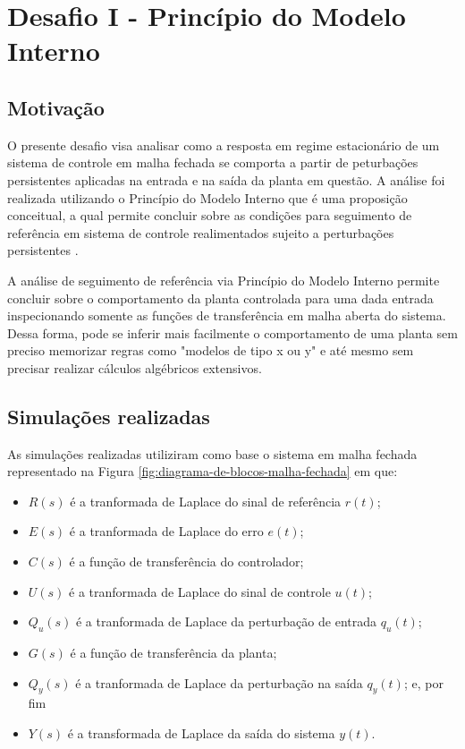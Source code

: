 \section{Desafio I - Princípio do Modelo Interno}

\subsection{Motivação}
O presente desafio visa analisar como a resposta em regime estacionário de um
sistema de controle em malha fechada se comporta a partir de peturbações
persistentes aplicadas na entrada e na saída da planta em questão. A análise foi
realizada utilizando o Princípio do Modelo Interno que é uma proposição
conceitual, a qual permite concluir sobre as condições para seguimento de
referência em sistema de controle realimentados sujeito a perturbações
persistentes \cite{Tito2021}.

A análise de seguimento de referência via Princípio do Modelo Interno permite
concluir sobre o comportamento da planta controlada para uma dada entrada
inspecionando somente as funções de transferência em malha aberta do sistema.
Dessa forma, pode se inferir mais facilmente o comportamento de uma planta sem
preciso memorizar regras como "modelos de tipo x ou y" e até mesmo sem precisar
realizar cálculos algébricos extensivos.

\subsection{Simulações realizadas}
\label{sec:simulacao-realizadas}
As simulações realizadas utiliziram como base o sistema em malha fechada
representado na Figura \ref{fig:diagrama-de-blocos-malha-fechada} em que:
\begin{itemize}
    \item $R(s)$ é a tranformada de Laplace do sinal de referência $r(t)$;
    \item $E(s)$ é a tranformada de Laplace do erro $e(t)$;
    \item $C(s)$ é a função de transferência do controlador;
    \item $U(s)$ é a tranformada de Laplace do sinal de controle $u(t)$;
    \item $Q_{u}(s)$ é a tranformada de Laplace da perturbação de entrada
    $q_{u}(t)$;
    \item $G(s)$ é a função de transferência da planta;
    \item $Q_{y}(s)$ é a tranformada de Laplace da perturbação na saída
    $q_{y}(t)$; e, por fim
    \item $Y(s)$ é a transformada de Laplace da saída do sistema $y(t)$.
\end{itemize}

